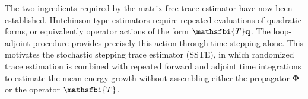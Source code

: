 \begin{appendices}
The two ingredients required by the matrix-free trace estimator have now been established. Hutchinson-type estimators require repeated evaluations of quadratic forms, or equivalently operator actions of the form \(\mathsfbi{T}\mathbf{q}\). The loop-adjoint procedure provides precisely this action through time stepping alone. This motivates the stochastic stepping trace estimator (SSTE), in which randomized trace estimation is combined with repeated forward and adjoint time integrations to estimate the mean energy growth without assembling either the propagator \(\boldsymbol{\Phi}\) or the operator \(\mathsfbi{T}\).
\end{appendices}
